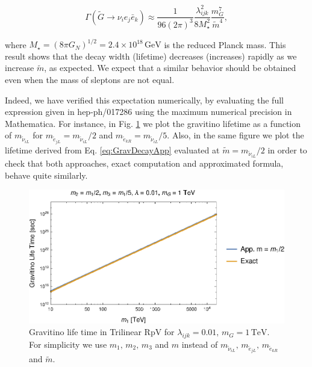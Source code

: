 \documentclass[a4paper,11pt]{article}
\begin{document}
\begin{equation}
\Gamma(\tilde{G}\rightarrow\nu_{i}e_{j}\bar{e}_{k})\approx\frac{1}{96(2\pi)^{3}}\frac{\lambda_{ijk}^{2}}{8M_{\star}^{2}}\frac{m_{G}^{7}}{\tilde{m}^{4}},\label{eq:GravDecayApp}
\end{equation}


\noindent where $M_{\star}=(8\pi G_{N})^{1/2}=2.4\times10^{18}\,\mbox{GeV}$
is the reduced Planck mass. This result shows that the decay width
(lifetime) decreases (increases) rapidly as we increase $\tilde{m}$,
as expected. We expect that a similar behavior should be obtained
even when the mass of sleptons are not equal.

Indeed, we have verified this expectation numerically, by evaluating
the full expression given in hep-ph/017286 using the maximum numerical
precision in Mathematica. For instance, in Fig. \ref{fig:Gravitino-life-time}
we plot the gravitino lifetime as a function of $m_{\tilde{\nu}_{iL}}$
for $m_{\tilde{e}_{jL}}=m_{\tilde{\nu}_{iL}}/2$ and $m_{\tilde{e}_{kR}}=m_{\tilde{\nu}_{iL}}/5$.
Also, in the same figure we plot the lifetime derived from Eq. \ref{eq:GravDecayApp}
evaluated at $\tilde{m}=m_{\tilde{\nu}_{iL}}/2$ in order to check
that both approaches, exact computation and approximated formula,
behave quite similarly.

\begin{figure}
\begin{centering}
\includegraphics[scale=1.2]{GravitinoDecaym1m2m3Final}
\par\end{centering}

\caption{\label{fig:Gravitino-life-time}Gravitino life time in Trilinear RpV
for $\lambda_{ijk}=0.01,\,m_{G}=1\,\mbox{TeV}$. For simplicity we
use $m_{1},\,m_{2},\,m_{3}$ and $m$ instead of $m_{\tilde{\nu}_{iL}},\,m_{\tilde{e}_{jL}},\,m_{\tilde{e}_{kR}}$
and $\tilde{m}$.}
\end{figure}
\end{document}
